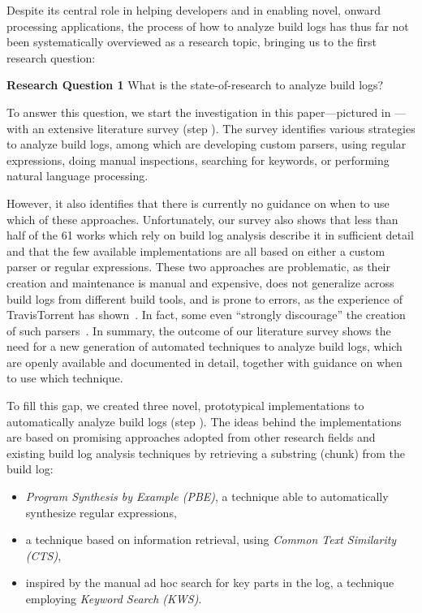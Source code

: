 Despite its central role in helping developers and in enabling
novel, onward processing applications,
the process of how to
analyze build logs has thus far not been systematically
overviewed as a research topic, bringing us to the first
research question:
\begin{simplebox}[minipage boxed title*=-5cm]{\textbf{Research Question
1}}
What is the state-of-research to analyze build logs?
\end{simplebox}

To answer this question, we start the investigation in this
paper---pictured in
---with an
extensive literature survey (step ).
The survey identifies various strategies to
analyze build logs, among which are developing
custom parsers, using regular expressions, doing manual inspections,
searching for keywords, or performing natural language processing.

However, it also identifies that there is currently no guidance on when
to use which of these
approaches.
Unfortunately, our survey also shows that
less than half of the 61 works which rely on build log analysis
describe it in sufficient detail and that
the few available implementations are all based on either a custom parser
or regular expressions.
These two approaches are problematic, as their creation
and maintenance is manual and expensive, does not generalize across build
logs from different build tools, and is prone to errors,
as the experience of
TravisTorrent has
shown~\cite{beller2017travistorrent,travistorrentquestions}.
In fact, some even ``strongly discourage'' the creation of such
parsers~\cite{urli2018design}.
In summary, the outcome of our literature survey shows the need for a new
generation of automated techniques to analyze build logs, which are
openly available and documented in detail, together with
guidance on when to use which technique.

To fill this gap, we created three novel, prototypical
implementations to
automatically analyze build logs (step ).
The ideas behind the implementations are based on promising approaches
adopted from other research fields and existing build log analysis
techniques by retrieving a substring (chunk) from the build log:
\begin{itemize}
	\item \emph{Program Synthesis by Example (PBE)}, a technique
	able to
	automatically synthesize regular expressions,
	\item a technique based on information
	retrieval, using \emph{Common Text Similarity (CTS)},
	\item inspired by the manual ad hoc search for key parts in the
	log, a
	technique employing \emph{Keyword Search (KWS)}.
\end{itemize}

